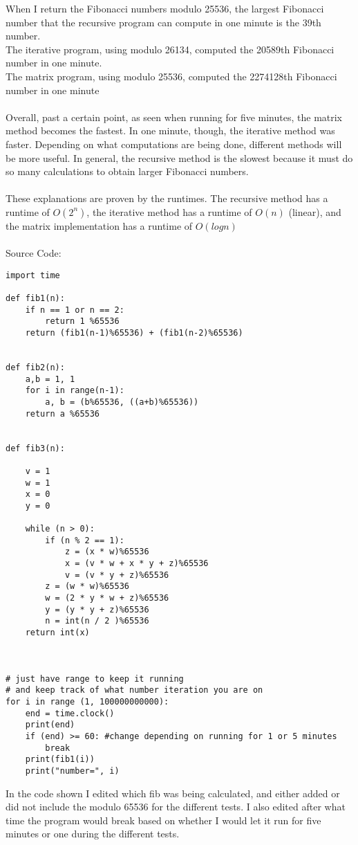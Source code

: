 \documentclass[11pt]{article}
\begin{document}
\begin{enumerate}
When I return the Fibonacci numbers modulo 25536, the largest Fibonacci number that the recursive program can compute in one minute is the 39th number.\\
The iterative program, using modulo 26134, computed the 20589th Fibonacci number in one minute. \\
The matrix program, using modulo 25536, computed the 2274128th Fibonacci number in one minute\\\\
Overall, past a certain point, as seen when running for five minutes, the matrix method becomes the fastest. In one minute, though, the iterative method was faster. Depending on what computations are being done, different methods will be more useful. In general, the recursive method is the slowest because it must do so many calculations to obtain larger Fibonacci numbers. \\\\
These explanations are proven by the runtimes. The recursive method has a runtime of $ O(2^n)$, the iterative method has a runtime of $O(n)$ (linear), and the matrix implementation has a runtime of $O(logn)$
\\\\
Source Code:
\begin{verbatim}
import time

def fib1(n):
    if n == 1 or n == 2:
        return 1 %65536
    return (fib1(n-1)%65536) + (fib1(n-2)%65536)


def fib2(n):
    a,b = 1, 1
    for i in range(n-1):
        a, b = (b%65536, ((a+b)%65536)) 
    return a %65536


def fib3(n):

    v = 1
    w = 1
    x = 0
    y = 0

    while (n > 0):
        if (n % 2 == 1):
            z = (x * w)%65536
            x = (v * w + x * y + z)%65536
            v = (v * y + z)%65536
        z = (w * w)%65536
        w = (2 * y * w + z)%65536
        y = (y * y + z)%65536
        n = int(n / 2 )%65536
    return int(x)



# just have range to keep it running 
# and keep track of what number iteration you are on
for i in range (1, 100000000000):
    end = time.clock()
    print(end)
    if (end) >= 60: #change depending on running for 1 or 5 minutes
        break
    print(fib1(i))
    print("number=", i)
\end{verbatim}
In the code shown I edited which fib was being calculated, and either added or did not include the modulo 65536 for the different tests. I also edited after what time the program would break based on whether I would let it run for five minutes or one during the different tests. 




\end{enumerate}
\end{document}
